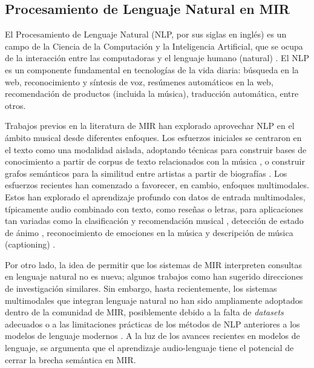 \subsection{Procesamiento de Lenguaje Natural en MIR}
\label{subsec:NLP_in_MIR}
El Procesamiento de Lenguaje Natural (NLP, por sus siglas en inglés) es un campo de la Ciencia de la Computación y la Inteligencia Artificial, que se ocupa de la interacción entre las computadoras y el lenguaje humano (natural) \cite{NLP4MIR}. El NLP es un componente fundamental en tecnologías de la vida diaria: búsqueda en la web, reconocimiento y síntesis de voz, resúmenes automáticos en la web, recomendación de productos (incluida la música), traducción automática, entre otros.

Trabajos previos en la literatura de MIR han explorado aprovechar NLP en el ámbito musical desde diferentes enfoques. Los esfuerzos iniciales se centraron en el texto como una modalidad aislada, adoptando técnicas para construir bases de conocimiento a partir de corpus de texto relacionados con la música \cite{Oramas2016InformationEF}, o construir grafos semánticos para la similitud entre artistas a partir de biografías \cite{Oramas2015ASA}. Los esfuerzos recientes han comenzado a favorecer, en cambio, enfoques multimodales. Estos han explorado el aprendizaje profundo con datos de entrada multimodales, típicamente audio combinado con texto, como reseñas o letras, para aplicaciones tan variadas como la clasificación y recomendación musical \cite{Oramas2018MultimodalDL}, detección de estado de ánimo \cite{Delbouys2018MusicMD}, reconocimiento de emociones en la música \cite{Jeon2017MusicER} y descripción de música (captioning) \cite{Manco2021MusCapsGC, Cai2020MusicAA}.

Por otro lado, la idea de permitir que los sistemas de MIR interpreten consultas en lenguaje natural no es nueva; algunos trabajos como \cite{Whitman2002MusicalQA} han sugerido direcciones de investigación similares. Sin embargo, hasta recientemente, los sistemas multimodales que integran lenguaje natural no han sido ampliamente adoptados dentro de la comunidad de MIR, posiblemente debido a la falta de \textit{datasets} adecuados o a las limitaciones prácticas de los métodos de NLP anteriores a los modelos de lenguaje modernos \cite{Manco2022ContrastiveAL}. A la luz de los avances recientes en modelos de lenguaje, se argumenta que el aprendizaje audio-lenguaje tiene el potencial de cerrar la brecha semántica en MIR.


